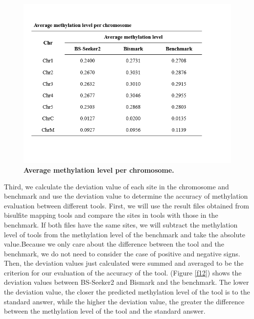 \documentclass{PHlab-thesis}
\begin{document}
\begin{figure}[h]
  \centering
  \includegraphics[scale=0.8]{table/table4.png}
  \caption{\textbf{Average methylation level per chromosome.}}
  \label{f11}
\end{figure}

Third, we calculate the deviation value of each site in the chromosome and benchmark and use the deviation value to determine the accuracy of methylation evaluation between different tools. First, we will use the result files obtained from bisulfite mapping tools and compare the sites in tools with those in the benchmark. If both files have the same sites, we will subtract the methylation level of tools from the methylation level of the benchmark and take the absolute value.Because we only care about the difference between the tool and the benchmark, we do not need to consider the case of positive and negative signs. Then, the deviation values just calculated were summed and averaged to be the criterion for our evaluation of the accuracy of the tool. (Figure \ref{f12}) shows the deviation values between BS-Seeker2 and Bismark and the benchmark. The lower the deviation value, the closer the predicted methylation level of the tool is to the standard answer, while the higher the deviation value, the greater the difference between the methylation level of the tool and the standard answer.
\end{document}
